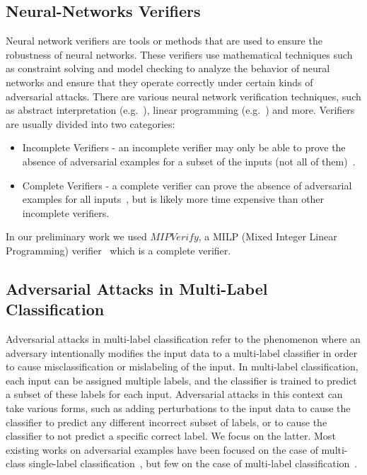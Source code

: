 \documentclass[11pt]{article}
\begin{document}
\subsection{Neural-Networks Verifiers}
Neural network verifiers are tools or methods that are used to ensure the robustness of neural networks.
These verifiers use mathematical techniques such as constraint solving and model checking to analyze the behavior of neural networks and ensure that they operate correctly under certain kinds of adversarial attacks.
There are various neural network verification techniques, such as abstract interpretation (e.g.~\cite{ABSTRACTINTER, INCOMPLETE1}), linear programming (e.g.~\cite{MIPVERIFY}) and more.
Verifiers are usually divided into two categories:
\begin{itemize}
    \item Incomplete Verifiers - an incomplete verifier may only be able to prove the absence of adversarial examples for a subset of the inputs (not all of them)~\cite{INCOMPLETE1, INCOMPLETE2}.
    \item Complete Verifiers - a complete verifier can prove the absence of adversarial examples for all inputs~\cite{MIPVERIFY, COMPLETE}, but is likely more time expensive than other incomplete verifiers.
\end{itemize}
In our preliminary work we used $MIPVerify$, a MILP (Mixed Integer Linear Programming) verifier~\cite{MIPVERIFY} which is a complete verifier.

\subsection{Adversarial Attacks in Multi-Label Classification}
Adversarial attacks in multi-label classification refer to the phenomenon where an adversary intentionally modifies the input data to a multi-label classifier in order to cause misclassification or mislabeling of the input.
In multi-label classification, each input can be assigned multiple labels, and the classifier is trained to predict a subset of these labels for each input.
Adversarial attacks in this context can take various forms, such as adding perturbations to the input data to cause the classifier to predict any different incorrect subset of labels, or to cause the classifier to not predict a specific correct label.
We focus on the latter.
Most existing works on adversarial examples have been focused on the case of multi-class single-label classification~\cite{SINGLElABEL1, SINGLElABEL2, SINGLElABEL3, SINGLElABEL4}, but few on the case of multi-label classification~\cite{MULTIlABEL}.
\end{document}

